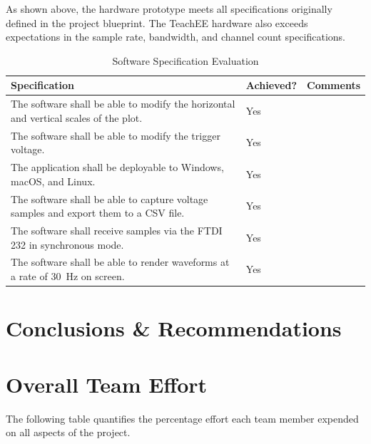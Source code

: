 \documentclass[letterpaper,11pt]{article}
\begin{document}
As shown above, the hardware prototype meets all specifications originally
defined in the project blueprint. The TeachEE hardware also exceeds expectations
in the sample rate, bandwidth, and channel count specifications.

\begin{table}[H]
  \caption{Software Specification Evaluation}
  \begin{tabularx}{\textwidth}{l|l|p{5cm}}
    Specification & Achieved? & Comments\\
    \hline
    The software shall be able to modify the horizontal and vertical scales of the plot. & Yes & \\
    The software shall be able to modify the trigger voltage. & Yes & \\
    The application shall be deployable to Windows, macOS, and Linux. & Yes & \\
    \hline
    The software shall be able to capture voltage samples and export them to a CSV file. & Yes & \\
    The software shall receive samples via the FTDI 232 in synchronous mode. & Yes & \\
    \hline
    The software shall be able to render waveforms at a rate of \SI{30}{\hertz} on screen. & Yes & \\
    \hline
  \end{tabularx} 
  \label{tab:sw-spec-eval}
\end{table}

\section{Conclusions \& Recommendations} %

\section{Overall Team Effort}
The following table quantifies the percentage effort each team member expended
on all aspects of the project.
\end{document}
